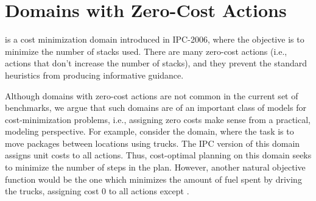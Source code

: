 \section{Domains with Zero-Cost Actions}
\label{sec:zerocost-domains}
  is a cost
minimization domain introduced in IPC-2006, where the objective is to 
minimize the number of stacks used.
There are many zero-cost actions (i.e., actions that don't increase the number of stacks), and
they prevent the standard heuristics from producing
informative guidance.



Although domains with zero-cost actions are not common in the current set of benchmarks, we argue that such domains are of an important class of models for cost-minimization problems, i.e.,
assigning zero costs make sense from a practical, modeling perspective.
For example, consider the  domain, where the task is to move packages between locations using trucks.
The IPC version of this domain assigns unit costs to all actions. Thus, cost-optimal planning on this domain seeks to minimize the number of steps in the plan.
However, another natural objective function would be the one which minimizes the amount of fuel spent by driving the trucks,
assigning cost 0 to all actions except .

